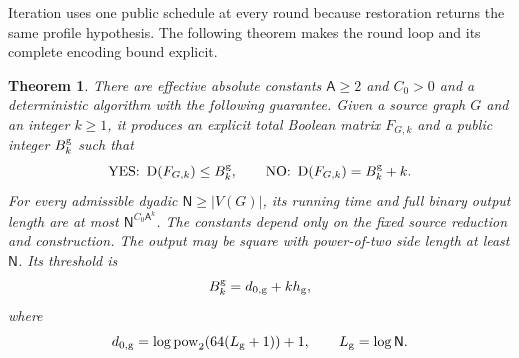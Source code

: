 \documentclass[11pt]{article} \usepackage[utf8]{inputenc}
\theoremstyle{plain} \newtheorem{theorem}{Theorem}[section]
\theoremstyle{definition} \newaliascnt{definition}{theorem}
\newcommand{\D}{\operatorname{D}}
\begin{document}
Iteration uses one public schedule at every round because restoration returns
the same profile hypothesis. The following theorem makes the round loop and its
complete encoding bound explicit.

\begin{theorem}\label{det:reduction}
There are effective absolute constants \(\mathsf A\ge2\) and \(C_0>0\) and a
deterministic algorithm with the following guarantee. Given a source graph \(G\)
and an integer \(k\ge1\), it produces an explicit total Boolean matrix
\(F_{G,k}\) and a public integer \(B_k^{\rm g}\) such that
\[
\text{YES: }\D(F_{G,k})\le B_k^{\rm g},\qquad \text{NO: }\D(F_{G,k})=B_k^{\rm
g}+k.
\]
For every admissible dyadic \(\mathsf N\ge|V(G)|\), its running time and full
binary output length are at most \(\mathsf N^{C_0\mathsf A^k}\). The constants
depend only on the fixed source reduction and construction. The output may be
square with power-of-two side length at least \(\mathsf N\). Its threshold is
\[
B_k^{\rm g}=d_{0,\rm g}+kh_{\rm g},
\]
where
\[
d_{0,\rm g}=\log\operatorname{pow}_2(64(L_{\rm g}+1))+1,\qquad L_{\rm
g}=\log\mathsf N.
\]
\end{theorem}
\end{document}
